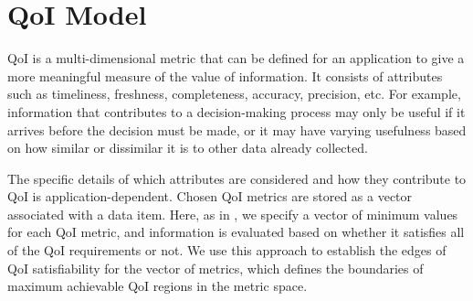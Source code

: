 \section{QoI Model}
\label{sec:qoi_model}


QoI is a multi-dimensional metric that can be defined for an application to give a more meaningful measure of the value of information.  It consists of attributes such as  timeliness, freshness, completeness, accuracy, precision, etc.  
For example, information that contributes to a decision-making process may only be useful if it arrives before the decision must be made, or it may have varying usefulness based on how similar or dissimilar it is to other data already collected.

The specific details of which attributes are considered and how they contribute to QoI is application-dependent.  Chosen QoI metrics are stored as a vector associated with a data item.  
Here, as in \cite{qoi_aware_tactical_mil_nets}, we specify a vector of minimum values for each QoI metric, and 
information is evaluated based on whether it satisfies all of the QoI requirements or not.  We use this approach to establish the edges of QoI satisfiability for the vector of metrics, which defines the boundaries of maximum achievable QoI regions in the metric space.

